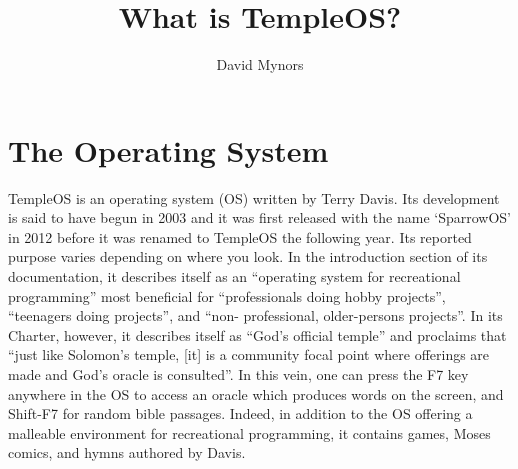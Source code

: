 \documentclass{article}
\author{David Mynors}
\title{What is TempleOS?}
\begin{document}
\section*{The Operating System}

TempleOS is an operating system (OS) written by Terry Davis.
Its development is said to have begun in 2003
and it was first released with the name `SparrowOS' in 2012 before
it was renamed to TempleOS the following year.
Its reported purpose varies depending on where you look.
In the introduction section of its documentation, it describes itself as
an ``operating system for recreational programming'' most beneficial for
``professionals doing hobby projects'', ``teenagers doing projects'',
and ``non- professional, older-persons projects''.
In its Charter, however, it describes itself as ``God's official temple''
and proclaims that
``just like Solomon’s temple, [it] is a community focal point
where offerings are made and God’s oracle is consulted''.
In this vein, one can press the F7 key anywhere in the OS
to access an oracle which produces words on the screen,
and Shift-F7 for random bible passages.
Indeed, in addition to the OS offering
a malleable environment for recreational programming,
it contains games, Moses comics, and hymns authored by Davis.
\end{document}
